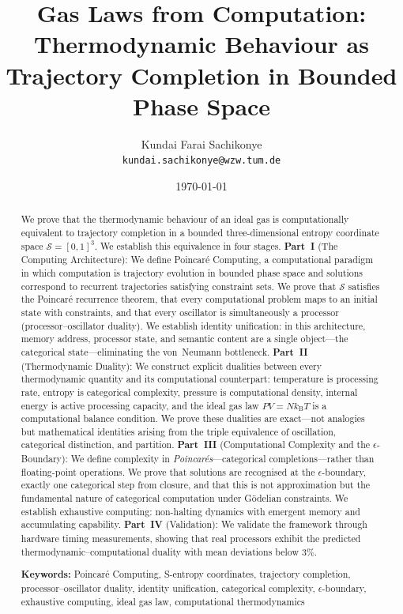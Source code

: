\documentclass[twocolumn,10pt,a4paper]{article}
\title{\textbf{Gas Laws from Computation:\\Thermodynamic Behaviour as Trajectory Completion in Bounded Phase Space}}
\author{
Kundai Farai Sachikonye\\
\texttt{kundai.sachikonye@wzw.tum.de}
}
\date{\today}
\theoremstyle{plain}
\theoremstyle{definition}
\theoremstyle{remark}
\newcommand{\kB}{k_{\mathrm{B}}}
\newcommand{\Sspace}{\mathcal{S}}
\begin{document}
\maketitle

\begin{abstract}
\noindent We prove that the thermodynamic behaviour of an ideal gas is computationally equivalent to trajectory completion in a bounded three-dimensional entropy coordinate space $\Sspace = [0,1]^3$. We establish this equivalence in four stages. \textbf{Part~I} (The Computing Architecture): We define Poincar\'{e} Computing, a computational paradigm in which computation is trajectory evolution in bounded phase space and solutions correspond to recurrent trajectories satisfying constraint sets. We prove that $\Sspace$ satisfies the Poincar\'{e} recurrence theorem, that every computational problem maps to an initial state with constraints, and that every oscillator is simultaneously a processor (processor--oscillator duality). We establish identity unification: in this architecture, memory address, processor state, and semantic content are a single object---the categorical state---eliminating the von~Neumann bottleneck. \textbf{Part~II} (Thermodynamic Duality): We construct explicit dualities between every thermodynamic quantity and its computational counterpart: temperature is processing rate, entropy is categorical complexity, pressure is computational density, internal energy is active processing capacity, and the ideal gas law $PV = N\kB T$ is a computational balance condition. We prove these dualities are exact---not analogies but mathematical identities arising from the triple equivalence of oscillation, categorical distinction, and partition. \textbf{Part~III} (Computational Complexity and the $\epsilon$-Boundary): We define complexity in \emph{Poincar\'{e}s}---categorical completions---rather than floating-point operations. We prove that solutions are recognised at the $\epsilon$-boundary, exactly one categorical step from closure, and that this is not approximation but the fundamental nature of categorical computation under G\"{o}delian constraints. We establish exhaustive computing: non-halting dynamics with emergent memory and accumulating capability. \textbf{Part~IV} (Validation): We validate the framework through hardware timing measurements, showing that real processors exhibit the predicted thermodynamic--computational duality with mean deviations below 3\%.

\medskip
\noindent\textbf{Keywords:} Poincar\'{e} Computing, S-entropy coordinates, trajectory completion, processor--oscillator duality, identity unification, categorical complexity, $\epsilon$-boundary, exhaustive computing, ideal gas law, computational thermodynamics
\end{abstract}
\end{document}
